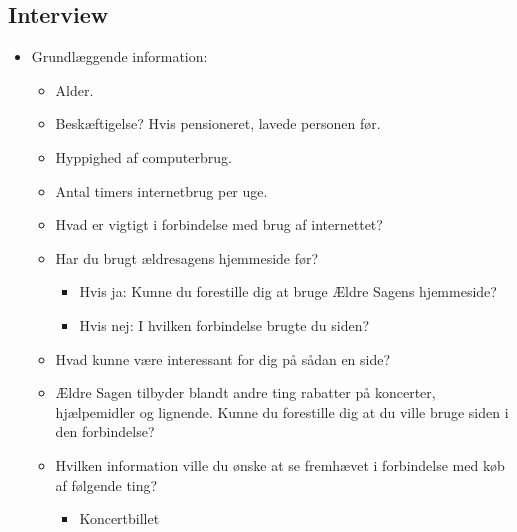 



\maketitle

\tableofcontents


\thispagestyle{empty}






\renewcommand{\appendixtocname}{Bilag}
\renewcommand{\appendixpagename}{Bilag}
\begin{appendices}
    \section{Interview}
    \label{b:interview}
    \begin{itemize}
    \item Grundlæggende information:
    \begin{itemize}
        \item Alder.
        \item Beskæftigelse? Hvis pensioneret, lavede personen før.
        \item Hyppighed af computerbrug.
        \item Antal timers internetbrug per uge.
        \item Hvad er vigtigt i forbindelse med brug af internettet?
        \item Har du brugt ældresagens hjemmeside før?
        \begin{itemize}
            \item Hvis ja: Kunne du forestille dig at bruge Ældre Sagens hjemmeside?
            \item Hvis nej: I hvilken forbindelse brugte du siden?
        \end{itemize}
        \item Hvad kunne være interessant for dig på sådan en side?
        \item Ældre Sagen tilbyder blandt andre ting rabatter på koncerter, hjælpemidler og lignende. Kunne du forestille dig at du ville bruge siden i den forbindelse?
        \item Hvilken information ville du ønske at se fremhævet i forbindelse med køb af følgende ting?
        \begin{itemize}
            \item Koncertbillet

\end{itemize}
\end{itemize}
\end{itemize}
\end{appendices}

